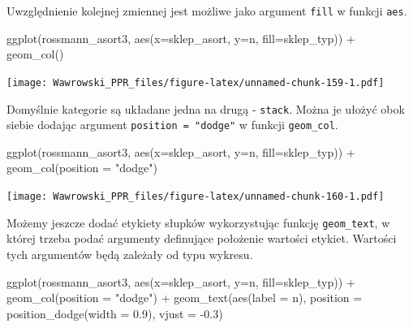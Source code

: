 \documentclass[
]{book}
\newenvironment{Shaded}{\begin{snugshade}}{\end{snugshade}}
\newcommand{\AttributeTok}[1]{\textcolor[rgb]{0.77,0.63,0.00}{#1}}
\newcommand{\FloatTok}[1]{\textcolor[rgb]{0.00,0.00,0.81}{#1}}
\newcommand{\FunctionTok}[1]{\textcolor[rgb]{0.00,0.00,0.00}{#1}}
\newcommand{\NormalTok}[1]{#1}
\newcommand{\SpecialCharTok}[1]{\textcolor[rgb]{0.00,0.00,0.00}{#1}}
\newcommand{\StringTok}[1]{\textcolor[rgb]{0.31,0.60,0.02}{#1}}
\begin{document}
Uwzględnienie kolejnej zmiennej jest możliwe jako argument \texttt{fill} w funkcji \texttt{aes}.

\begin{Shaded}
\begin{Highlighting}[]
\FunctionTok{ggplot}\NormalTok{(rossmann\_asort3, }\FunctionTok{aes}\NormalTok{(}\AttributeTok{x=}\NormalTok{sklep\_asort, }\AttributeTok{y=}\NormalTok{n, }\AttributeTok{fill=}\NormalTok{sklep\_typ)) }\SpecialCharTok{+}
  \FunctionTok{geom\_col}\NormalTok{()}
\end{Highlighting}
\end{Shaded}

\texttt{[image: Wawrowski\_PPR\_files/figure-latex/unnamed-chunk-159-1.pdf]}

Domyślnie kategorie są układane jedna na drugą - \texttt{stack}. Można je ułożyć obok siebie dodając argument \texttt{position\ =\ "dodge"} w funkcji \texttt{geom\_col}.

\begin{Shaded}
\begin{Highlighting}[]
\FunctionTok{ggplot}\NormalTok{(rossmann\_asort3, }\FunctionTok{aes}\NormalTok{(}\AttributeTok{x=}\NormalTok{sklep\_asort, }\AttributeTok{y=}\NormalTok{n, }\AttributeTok{fill=}\NormalTok{sklep\_typ)) }\SpecialCharTok{+}
  \FunctionTok{geom\_col}\NormalTok{(}\AttributeTok{position =} \StringTok{"dodge"}\NormalTok{)}
\end{Highlighting}
\end{Shaded}

\texttt{[image: Wawrowski\_PPR\_files/figure-latex/unnamed-chunk-160-1.pdf]}

Możemy jeszcze dodać etykiety słupków wykorzystując funkcję \texttt{geom\_text}, w której trzeba podać argumenty definujące położenie wartości etykiet. Wartości tych argumentów będą zależały od typu wykresu.

\begin{Shaded}
\begin{Highlighting}[]
\FunctionTok{ggplot}\NormalTok{(rossmann\_asort3, }\FunctionTok{aes}\NormalTok{(}\AttributeTok{x=}\NormalTok{sklep\_asort, }\AttributeTok{y=}\NormalTok{n, }\AttributeTok{fill=}\NormalTok{sklep\_typ)) }\SpecialCharTok{+}
  \FunctionTok{geom\_col}\NormalTok{(}\AttributeTok{position =} \StringTok{"dodge"}\NormalTok{) }\SpecialCharTok{+} 
  \FunctionTok{geom\_text}\NormalTok{(}\FunctionTok{aes}\NormalTok{(}\AttributeTok{label =}\NormalTok{ n), }
            \AttributeTok{position =} \FunctionTok{position\_dodge}\NormalTok{(}\AttributeTok{width =} \FloatTok{0.9}\NormalTok{),}
            \AttributeTok{vjust =} \SpecialCharTok{{-}}\FloatTok{0.3}\NormalTok{)}
\end{Highlighting}
\end{Shaded}
\end{document}
